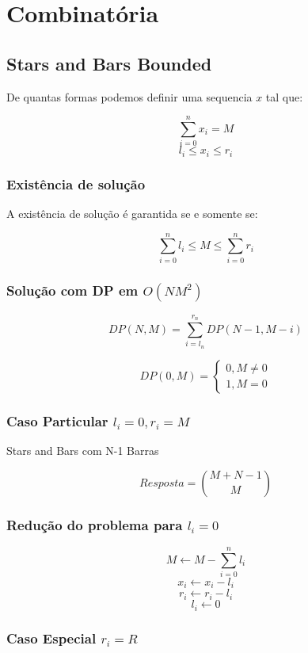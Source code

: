 \section{Combinatória}

\subsection{Stars and Bars Bounded}

De quantas formas podemos definir uma sequencia $x$ tal que:

$$ \sum^{n}_{i=0} x_i = M $$
$$ l_i \leq x_i \leq r_i $$

\subsubsection{Existência de solução}

A existência  de solução é garantida se e somente se:

$$ \sum^{n}_{i=0} l_i \leq M \leq \sum^{n}_{i=0} r_i $$

\subsubsection{Solução com DP em $ O(NM^2) $}

$$ DP(N, M) = \sum^{r_n}_{i=l_n} DP(N-1, M-i) $$

$$
DP(0, M) =
    \begin{cases}
        0, M \neq 0 \\
        1, M = 0
    \end{cases}
$$

\subsubsection{Caso Particular $ l_i = 0 , r_i = M$}

Stars and Bars com N-1 Barras

$$ Resposta = \binom{M+N-1}{M} $$

\subsubsection{Redução do problema para $l_i = 0$}

$$ M \xleftarrow{} M - \sum^{n}_{i=0} l_i $$
$$ x_i \xleftarrow{} x_i - l_i $$
$$ r_i \xleftarrow{} r_i - l_i $$
$$ l_i \xleftarrow{} 0 $$

\subsubsection{Caso Especial $ r_i = R $}

